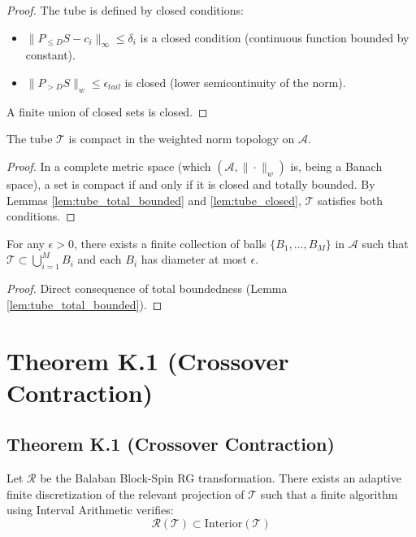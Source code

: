 \begin{proof}
The tube is defined by closed conditions:
\begin{itemize}
    \item $\|P_{\le D} S - c_i\|_\infty \leq \delta_i$ is a closed condition (continuous function bounded by constant).
    \item $\|P_{>D} S\|_w \leq \epsilon_{tail}$ is closed (lower semicontinuity of the norm).
\end{itemize}
A finite union of closed sets is closed.
\end{proof}

\begin{theorem}
\label{thm:tube_compact}
The tube $\mathcal{T}$ is compact in the weighted norm topology on $\mathcal{A}$.
\end{theorem}

\begin{proof}
In a complete metric space (which $(\mathcal{A}, \|\cdot\|_w)$ is, being a Banach space), a set is compact if and only if it is closed and totally bounded. By Lemmas \ref{lem:tube_total_bounded} and \ref{lem:tube_closed}, $\mathcal{T}$ satisfies both conditions.
\end{proof}

\begin{corollary}
\label{cor:finite_cover}
For any $\epsilon > 0$, there exists a finite collection of balls $\{B_1, \ldots, B_M\}$ in $\mathcal{A}$ such that $\mathcal{T} \subset \bigcup_{i=1}^M B_i$ and each $B_i$ has diameter at most $\epsilon$.
\end{corollary}

\begin{proof}
Direct consequence of total boundedness (Lemma \ref{lem:tube_total_bounded}).
\end{proof}

\section{Theorem K.1 (Crossover Contraction)}

\subsection{Theorem K.1 (Crossover Contraction)}
\begin{theorem}
Let $\mathcal{R}$ be the Balaban Block-Spin RG transformation. There exists an adaptive finite discretization of the relevant projection of $\mathcal{T}$ such that a finite algorithm using Interval Arithmetic verifies:
\begin{equation}
\mathcal{R}(\mathcal{T}) \subset \mathrm{Interior}(\mathcal{T})
\end{equation}
\end{theorem}


